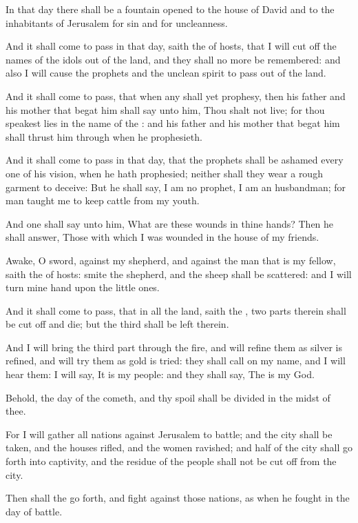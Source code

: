 \Chapter
\Verse In that day there shall be a fountain opened to the house of David and to the inhabitants of Jerusalem for sin and for uncleanness.

\Verse And it shall come to pass in that day, saith the \LORD of hosts, that I will cut off the names of the idols out of the land, and they shall no more be remembered: and also I will cause the prophets and the unclean spirit to pass out of the land.

\Verse And it shall come to pass, that when any shall yet prophesy, then his father and his mother that begat him shall say unto him, Thou shalt not live; for thou speakest lies in the name of the \LORD: and his father and his mother that begat him shall thrust him through when he prophesieth.

\Verse And it shall come to pass in that day, that the prophets shall be ashamed every one of his vision, when he hath prophesied; neither shall they wear a rough garment to deceive: \Verse But he shall say, I am no prophet, I am an husbandman; for man taught me to keep cattle from my youth.

\Verse And one shall say unto him, What are these wounds in thine hands?  Then he shall answer, Those with which I was wounded in the house of my friends.

\Verse Awake, O sword, against my shepherd, and against the man that is my fellow, saith the \LORD of hosts: smite the shepherd, and the sheep shall be scattered: and I will turn mine hand upon the little ones.

\Verse And it shall come to pass, that in all the land, saith the \LORD, two parts therein shall be cut off and die; but the third shall be left therein.

\Verse And I will bring the third part through the fire, and will refine them as silver is refined, and will try them as gold is tried: they shall call on my name, and I will hear them: I will say, It is my people: and they shall say, The \LORD is my God.


\Chapter
\Verse Behold, the day of the \LORD cometh, and thy spoil shall be divided in the midst of thee.

\Verse For I will gather all nations against Jerusalem to battle; and the city shall be taken, and the houses rifled, and the women ravished; and half of the city shall go forth into captivity, and the residue of the people shall not be cut off from the city.

\Verse Then shall the \LORD go forth, and fight against those nations, as when he fought in the day of battle.

